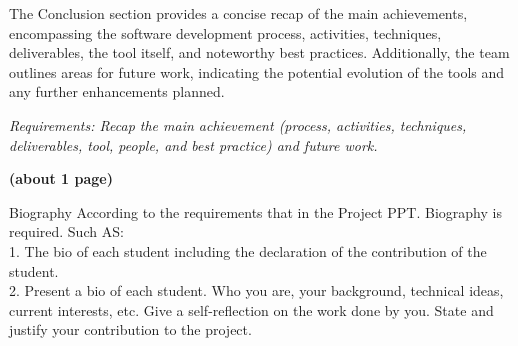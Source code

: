 \documentclass[journal]{IEEEtran}
\begin{document}
The Conclusion section provides a concise recap of the main achievements, encompassing the software development process, activities, techniques, deliverables, the tool itself, and noteworthy best practices. Additionally, the team outlines areas for future work, indicating the potential evolution of the tools and any further enhancements planned.

\textit{Requirements: Recap the main achievement (process, activities, techniques, deliverables, tool, people, and best practice) and future work.}

\textbf{(about 1 page)}


 

\vspace{-5 mm}
\begin{IEEEbiography}{Biography} According to the requirements that in the Project PPT. Biography is required. Such AS:\\
1. The bio of each student including the declaration of the contribution of the student.\\
2. Present a bio of each student. Who you are, your background, technical ideas, current interests, etc. Give a \textcolor{BurntOrange}{self-reflection} on the work done by you. \textcolor{BurntOrange}{State and justify your contribution} to the project.


\end{IEEEbiography}


\end{document}

